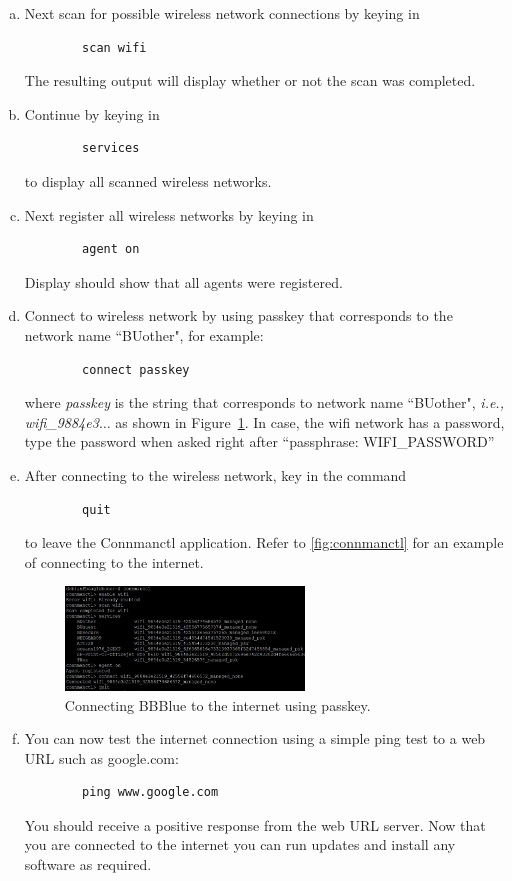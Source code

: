 \begin{enumerate}[a)]
    \item Next scan for possible wireless network connections by keying in
    \begin{verbatim}
        scan wifi
    \end{verbatim}
    The resulting output will display whether or not the scan was completed.
    \item Continue by keying in
    \begin{verbatim}
        services
    \end{verbatim}
    to display all scanned wireless networks.
    \item Next register all wireless networks by keying in
    \begin{verbatim}
        agent on
    \end{verbatim}
    Display should show that all agents were registered.
    
    \item Connect to wireless network by using passkey that corresponds to the network name ``BUother", for example: 
    \begin{verbatim}
        connect passkey
    \end{verbatim}
    where \textit{passkey} is the string  that corresponds to network name
    ``BUother", \textit{i.e.,} \emph{wifi\_9884e3$\ldots$} as shown in
    Figure~\ref{fig:connmanctl}. In case, the wifi network has a password, type
    the password when asked right after ``passphrase: WIFI\_PASSWORD'' 
    \item After connecting to the wireless network, key in the command
    \begin{verbatim}
        quit
    \end{verbatim}
    to leave the Connmanctl application. Refer to \autoref{fig:connmanctl} for an example of connecting to the internet.
    \begin{figure}[H]
        \centering
        \includegraphics[width= 0.6\textwidth]{figs/img/Lab0/connmanctl.JPG}
        \caption{Connecting BBBlue to the  internet using passkey.}
        \label{fig:connmanctl}
    \end{figure}    
    \item You can now test the internet connection using a simple ping test to a web URL such as google.com:
    \begin{verbatim}
        ping www.google.com
    \end{verbatim}
%   
You should receive a positive response from the web URL server. Now that you are connected to the internet you can run updates and install any software as required.
\end{enumerate}


